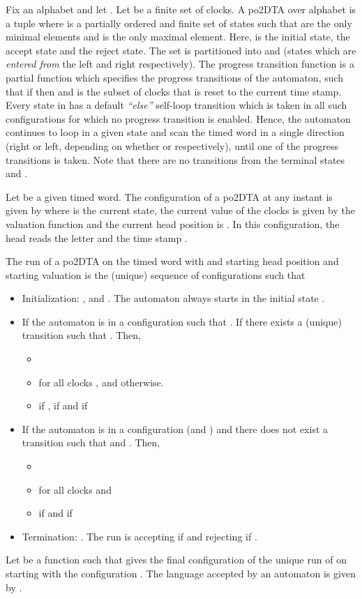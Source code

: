 \documentclass{llncs}
\newcommand{\potdta}{\mbox{}}
\begin{document}
\begin{definition}[Syntax of \potdta]
Fix an alphabet  and let . Let  be a finite set of clocks. A po2DTA over alphabet  is a tuple  where  is a partially
ordered and finite set of states such that  are the only minimal elements and  is the only maximal  element. Here,  is the initial state,  the accept state and  the reject state. The set  is partitioned into  and  (states which are \emph{entered from} the left and right respectively).  The progress transition function is a partial function 
which specifies the progress transitions of the automaton, such that if  then  and  is the subset of clocks that is reset to the current time stamp.
Every state  in  has a default \textit{``else''} self-loop transition which is taken in all
such configurations for which no progress transition is enabled. 
Hence, the automaton continues to loop in a given state  and scan the timed word in a single direction (right or left, depending on whether  or  respectively), until one of the progress transitions is taken. Note that there are no transitions from the terminal states  and . 

\end{definition}

\begin{definition}[Run]
Let  be a given timed word. 
The configuration of a po2DTA at any instant is given by  where  is the current state, the current value of the clocks is given by the valuation function  and the current head 
position is . In this configuration, the head reads the letter  and the time stamp  .

The run of a po2DTA on the timed word  with and starting head position  and starting 
valuation  is the (unique) sequence of configurations    such  that
\begin{itemize}
 \item Initialization: ,  and . The automaton always starts in the initial
 state .
\item  If the automaton is in a configuration  such that . If there exists a (unique) transition  such that . Then,
\begin{itemize}
 \item 
\item  for all clocks , and  otherwise.
\item  if ,  if  and   if 
\end{itemize}
\item If the automaton is in a configuration  (and ) and there does not exist a transition  such that  and . Then,
\begin{itemize}
 \item 
\item  for all clocks  and
\item  if  and  if 
\end{itemize}
\item Termination: . The run is accepting if  and rejecting if .
\end{itemize}
Let  be a function such that  gives the final configuration
 of the unique run of  on  starting with the configuration .
The language accepted by an automaton  is given by 
. 
\end{definition}
\end{document}
